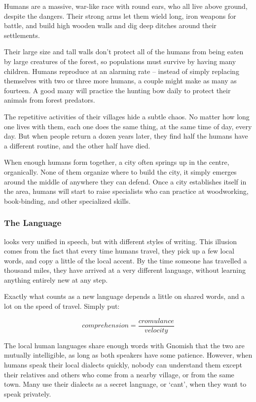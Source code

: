 \begin{multicols}{2}
\renewcommand\npcsymbol{\Hu}

\noindent
Humans are a massive, war-like race with round ears, who all live above ground, despite the dangers.
Their strong arms let them wield long, iron weapons for battle, and build high wooden walls and dig deep ditches around their settlements.

Their large size and tall walls don't protect all of the humans from being eaten by large creatures of the forest, so populations must survive by having many children.
Humans reproduce at an alarming rate -- instead of simply replacing themselves with two or three more humans, a couple might make as many as fourteen.
A good many will practice the hunting bow daily to protect their animals from forest predators.

The repetitive activities of their \glspl{village} hide a subtle chaos.
No matter how long one lives with them, each one does the same thing, at the same time of day, every day.
But when people return a dozen years later, they find half the humans have a different routine, and the other half have died.

When enough humans form together, a city often springs up in the centre, organically.
None of them organize where to build the city, it simply emerges around the middle of anywhere they can defend.
Once a city establishes itself in the area, humans will start to raise specialists who can practice at woodworking, book-binding, and other specialized skills.


\subsubsection{The Language}
looks very unified in speech, but with different styles of writing.
This illusion comes from the fact that every time humans travel, they pick up a few local words, and copy a little of the local accent.
By the time someone has travelled a thousand miles, they have arrived at a very different language, without learning anything entirely new at any step.

Exactly what counts as a new language depends a little on shared words, and a lot on the speed of travel.
Simply put:

$$ comprehension = \frac{cromulance}{velocity} $$

The local human languages share enough words with Gnomish that the two are mutually intelligible, as long as both speakers have some patience.
However, when humans speak their local dialects quickly, nobody can understand them except their relatives and others who come from a nearby \gls{village}, or from the same town.
Many use their dialects as a secret language, or `cant', when they want to speak privately.


\end{multicols}
